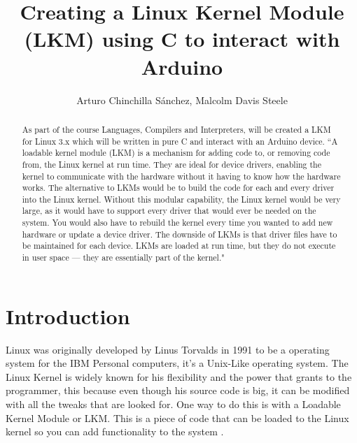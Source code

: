 \documentclass[12pt]{article}
\title{Creating a Linux Kernel Module (LKM) using C to interact with Arduino}
\author{Arturo Chinchilla Sánchez, Malcolm Davis Steele}
\begin{document}
\maketitle
\begin{abstract}
  As part of the course Languages, Compilers and Interpreters, will be created a LKM for Linux 3.x which will be written in pure C and interact with an Arduino device.
  “A loadable kernel module (LKM) is a mechanism for adding code to, or removing code from,
  the Linux kernel at run time. They are ideal for device drivers, enabling the kernel to
  communicate with the hardware without it having to know how the hardware works. The
  alternative to LKMs would be to build the code for each and every driver into the Linux kernel.
  Without this modular capability, the Linux kernel would be very large, as it would have to
  support every driver that would ever be needed on the system. You would also have to rebuild
  the kernel every time you wanted to add new hardware or update a device driver. The
  downside of LKMs is that driver files have to be maintained for each device. LKMs are loaded
  at run time, but they do not execute in user space — they are essentially part of the kernel."\cite{Molloy}
\end{abstract}

\newpage
\tableofcontents %
\listoffigures %

\newpage
\section{Introduction}

Linux was originally developed by Linus Torvalds in 1991 to be a operating system for the IBM Personal computers, it's a Unix-Like operating system. The Linux Kernel is widely known for his flexibility and the power that grants to the programmer, this because even though his source code is big, it can be modified with all the tweaks that are looked for. One way to do this is with a Loadable Kernel Module or LKM. This is a piece of code that can be loaded to the Linux kernel so you can add functionality to the system \cite{Hartman07}.
\end{document}

